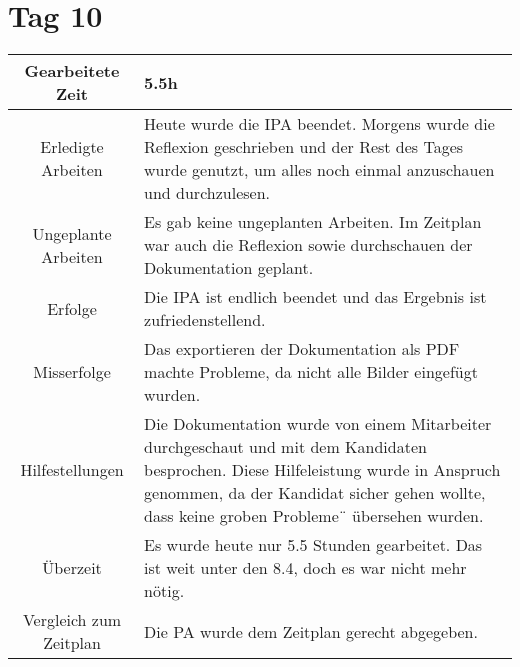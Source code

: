 \section{Tag 10}
\begin{tabularx}{\textwidth}[H]{|c|X|}
  \hline
  Gearbeitete Zeit & 5.5h \\ \hline
  Erledigte Arbeiten & Heute wurde die IPA beendet. Morgens wurde die Reflexion geschrieben und der Rest des Tages
  wurde genutzt, um alles noch einmal anzuschauen und durchzulesen. \\ \hline
  Ungeplante Arbeiten & Es gab keine ungeplanten Arbeiten. Im Zeitplan war auch die Reflexion sowie durchschauen
  der Dokumentation geplant. \\ \hline
  Erfolge & Die IPA ist endlich beendet und das Ergebnis ist zufriedenstellend. \\ \hline
  Misserfolge & Das exportieren der Dokumentation als PDF machte Probleme, da nicht alle Bilder eingefügt wurden.
  \\ \hline
  Hilfestellungen & Die Dokumentation wurde von einem Mitarbeiter durchgeschaut und mit dem Kandidaten besprochen.
  Diese Hilfeleistung wurde in Anspruch genommen, da der Kandidat sicher gehen wollte, dass keine groben Probleme¨
  übersehen wurden. \\ \hline
  Überzeit & Es wurde heute nur 5.5 Stunden gearbeitet. Das ist weit unter den 8.4, doch es war nicht mehr
  nötig. \\ \hline
  Vergleich zum Zeitplan & Die PA wurde dem Zeitplan gerecht abgegeben. \\ \hline
\end{tabularx}
